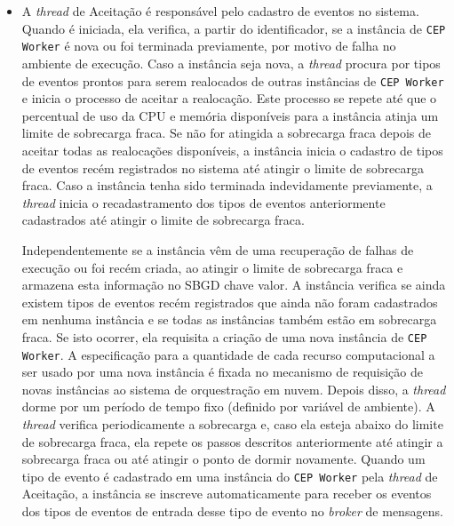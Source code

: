 \begin{itemize}
   
\item A \textit{thread} de Aceitação é responsável pelo cadastro de eventos no sistema. Quando é iniciada, ela verifica, a partir do identificador, se a instância de \texttt{CEP Worker} é nova ou foi terminada previamente, por motivo de falha no ambiente de execução. Caso a instância seja nova, a \textit{thread} procura por tipos de eventos prontos para serem realocados de outras instâncias de \texttt{CEP Worker} e inicia o processo de aceitar a realocação. Este processo se repete até que o percentual de uso da CPU e memória disponíveis para a instância atinja um limite de sobrecarga fraca. Se não for atingida a sobrecarga fraca depois de aceitar todas as realocações disponíveis, a instância inicia o cadastro de tipos de eventos recém registrados no sistema até atingir o limite de sobrecarga fraca. Caso a instância tenha sido terminada indevidamente previamente, a \textit{thread} inicia o recadastramento dos tipos de eventos  anteriormente cadastrados até atingir o limite de sobrecarga fraca.

Independentemente se a instância vêm de uma recuperação de falhas de execução ou foi recém criada, ao atingir o limite de sobrecarga fraca e armazena esta informação no SBGD chave valor. A instância verifica se ainda existem tipos de eventos recém registrados que ainda não foram cadastrados em nenhuma instância e se todas as instâncias também estão em sobrecarga fraca. Se isto ocorrer, ela requisita a criação de uma nova instância de \texttt{CEP Worker}. A especificação para a quantidade de cada recurso computacional a ser usado por uma nova instância é fixada no mecanismo de requisição de novas instâncias ao sistema de orquestração em nuvem. Depois disso, a \textit{thread} dorme por um período de tempo fixo (definido por variável de ambiente).
A \textit{thread} verifica periodicamente a sobrecarga e, caso ela esteja abaixo do limite de sobrecarga fraca, ela repete os passos descritos anteriormente até atingir a sobrecarga fraca ou até atingir o ponto de dormir novamente. Quando um tipo de evento é cadastrado em uma instância do \texttt{CEP Worker} pela \textit{thread} de Aceitação, a instância se inscreve automaticamente para receber os eventos dos tipos de eventos de entrada desse tipo de evento no \textit{broker} de mensagens.




\end{itemize}
